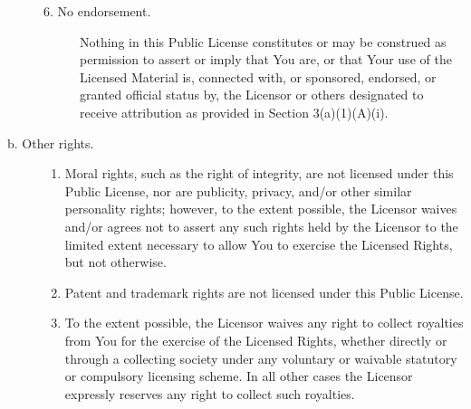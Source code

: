 \begin{description}
\begin{description}
\begin{description}
    \end{description}
    \item [6. No endorsement.] Nothing in this Public License constitutes or may be construed as permission to assert or imply that You are, or that Your use of the Licensed Material is, connected with, or sponsored, endorsed, or granted official status by, the Licensor or others designated to receive attribution as provided in Section 3(a)(1)(A)(i).
\end{description}

\item[b. Other rights.]
\begin{enumerate}
\item Moral rights, such as the right of integrity, are not licensed under this Public License, nor are publicity, privacy, and/or other similar personality rights; however, to the extent possible, the Licensor waives and/or agrees not to assert any such rights held by the Licensor to the limited extent necessary to allow You to exercise the Licensed Rights, but not otherwise.
\item Patent and trademark rights are not licensed under this Public License.
\item To the extent possible, the Licensor waives any right to collect royalties from You for the exercise of the Licensed Rights, whether directly or through a collecting society under any voluntary or waivable statutory or compulsory licensing scheme. In all other cases the Licensor expressly reserves any right to collect such royalties.
\end{enumerate}
\end{description}


